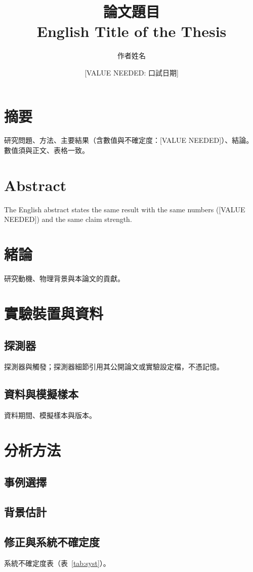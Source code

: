 \documentclass[a4paper, zihao = -4, openany]{ctexbook}
\title{論文題目\\[0.5em]\large English Title of the Thesis}
\author{作者姓名}
\date{[VALUE NEEDED: 口試日期]}
\begin{document}
\frontmatter
\maketitle

\chapter*{摘要}
研究問題、方法、主要結果（含數值與不確定度：[VALUE NEEDED]）、結論。數值須與正文、表格一致。

\chapter*{Abstract}
The English abstract states the same result with the same numbers ([VALUE NEEDED]) and the same claim strength.

\tableofcontents

\mainmatter

\chapter{緒論}
研究動機、物理背景與本論文的貢獻。

\chapter{實驗裝置與資料}
\section{探測器}
探測器與觸發；探測器細節引用其公開論文或實驗設定檔，不憑記憶。
\section{資料與模擬樣本}
資料期間、模擬樣本與版本。

\chapter{分析方法}
\section{事例選擇}
\section{背景估計}
\section{修正與系統不確定度}
系統不確定度表（表~\ref{tab:syst}）。
\end{document}
